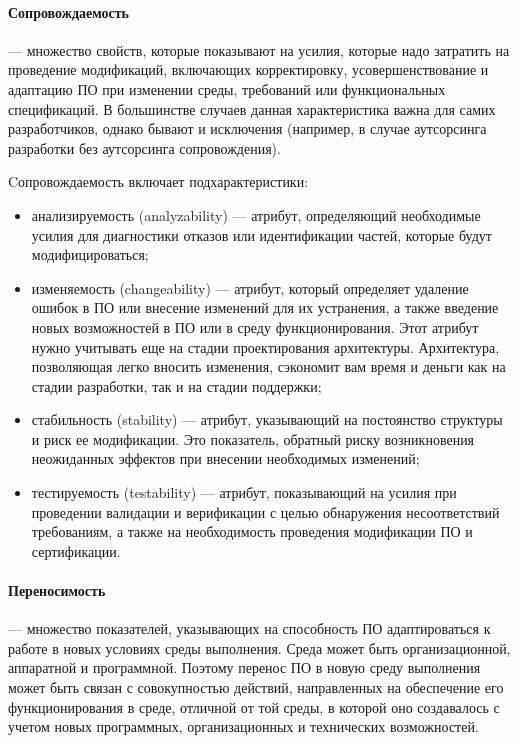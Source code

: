\documentclass{../../text-style}
\begin{document}
\paragraph{Сопровождаемость} --- множество свойств, которые показывают на усилия, которые надо затратить на проведение модификаций, включающих корректировку, усовершенствование и адаптацию ПО при изменении среды, требований или функциональных спецификаций. В большинстве случаев данная характеристика важна для самих разработчиков, однако бывают и исключения (например, в случае аутсорсинга разработки без аутсорсинга сопровождения).

Cопровождаемость включает подхарактеристики:

\begin{itemize}
    \item анализируемость (analyzability) --- атрибут, определяющий необходимые усилия для диагностики отказов или идентификации частей, которые будут модифицироваться;
    \item изменяемость (changeability) --- атрибут, который определяет удаление ошибок в ПО или внесение изменений для их устранения, а также введение новых возможностей в ПО или в среду функционирования. Этот атрибут нужно учитывать еще на стадии проектирования архитектуры. Архитектура, позволяющая легко вносить изменения, сэкономит вам время и деньги как на стадии разработки, так и на стадии поддержки;
    \item стабильность (stability) --- атрибут, указывающий на постоянство структуры и риск ее модификации. Это показатель, обратный риску возникновения неожиданных эффектов при внесении необходимых изменений;
    \item тестируемость (testability) --- атрибут, показывающий на усилия при проведении валидации и верификации с целью обнаружения несоответствий требованиям, а также на необходимость проведения модификации ПО и сертификации.
\end{itemize}

\paragraph{Переносимость} --- множество показателей, указывающих на способность ПО адаптироваться к работе в новых условиях среды выполнения. Среда может быть организационной, аппаратной и программной. Поэтому перенос ПО в новую среду выполнения может быть связан с совокупностью действий, направленных на обеспечение его функционирования в среде, отличной от той среды, в которой оно создавалось с учетом новых программных, организационных и технических возможностей.
\end{document}
